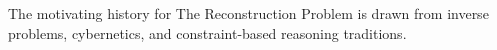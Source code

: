 The motivating history for The Reconstruction Problem is drawn from inverse problems, cybernetics, and constraint-based reasoning traditions.
